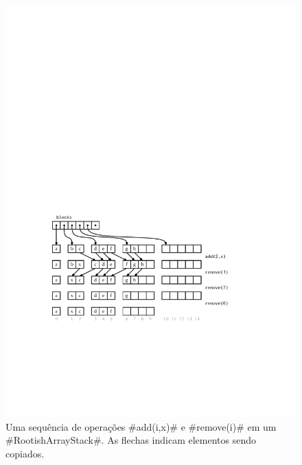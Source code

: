 \begin{figure}
	\begin{center}
		\includegraphics[width=\ScaleIfNeeded]{figs/rootisharraystack}
	\end{center}
	\caption[Adicionando ou removendo em um RootishArrayStack]{Uma sequência de operações #add(i,x)# e #remove(i)# em um
		#RootishArrayStack#.  As flechas indicam elementos sendo copiados. }
\end{figure}


